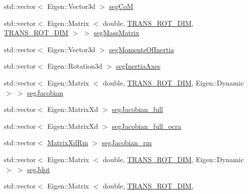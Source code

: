\begin{DoxyCompactItemize}
\item 
std\-::vector$<$ \-Eigen\-::\-Vector3d $>$ \hyperlink{structOcraWbiModel_1_1OcraWbiModel__pimpl_af244a33c7309714ca793d29247ead8b8}{seg\-Co\-M}
\item 
std\-::vector$<$ \-Eigen\-::\-Matrix\*
$<$ double, \hyperlink{OcraWbiModel_8cpp_ab4a87cb824ceff256c6b8bce7701af58}{\-T\-R\-A\-N\-S\-\_\-\-R\-O\-T\-\_\-\-D\-I\-M}, \*
\hyperlink{OcraWbiModel_8cpp_ab4a87cb824ceff256c6b8bce7701af58}{\-T\-R\-A\-N\-S\-\_\-\-R\-O\-T\-\_\-\-D\-I\-M} $>$ $>$ \hyperlink{structOcraWbiModel_1_1OcraWbiModel__pimpl_a3d0cb4cfda4c6ce54020d61f5845dedb}{seg\-Mass\-Matrix}
\item 
std\-::vector$<$ \-Eigen\-::\-Vector3d $>$ \hyperlink{structOcraWbiModel_1_1OcraWbiModel__pimpl_a478fcde74e00dc9b8235bbe5a2c2cb75}{seg\-Moments\-Of\-Inertia}
\item 
std\-::vector$<$ \-Eigen\-::\-Rotation3d $>$ \hyperlink{structOcraWbiModel_1_1OcraWbiModel__pimpl_aba2d3ed2e0c2a1a1b8b4d40c3df6a4a5}{seg\-Inertia\-Axes}
\item 
std\-::vector$<$ \-Eigen\-::\-Matrix\*
$<$ double, \hyperlink{OcraWbiModel_8cpp_ab4a87cb824ceff256c6b8bce7701af58}{\-T\-R\-A\-N\-S\-\_\-\-R\-O\-T\-\_\-\-D\-I\-M}, \*
\-Eigen\-::\-Dynamic $>$ $>$ \hyperlink{structOcraWbiModel_1_1OcraWbiModel__pimpl_a3430097cc1a200a4ff5abcafd52a7d44}{seg\-Jacobian}
\item 
std\-::vector$<$ \-Eigen\-::\-Matrix\-Xd $>$ \hyperlink{structOcraWbiModel_1_1OcraWbiModel__pimpl_abdfc807c93bad49781c9ad0f1588b203}{seg\-Jacobian\-\_\-full}
\item 
std\-::vector$<$ \-Eigen\-::\-Matrix\-Xd $>$ \hyperlink{structOcraWbiModel_1_1OcraWbiModel__pimpl_ad4acb4942706d77c1dfd480132592ded}{seg\-Jacobian\-\_\-full\-\_\-ocra}
\item 
std\-::vector$<$ \hyperlink{namespaceocra__icub_aa5e36a19ed031c28ca83c207bd7dd83f}{\-Matrix\-Xd\-Rm} $>$ \hyperlink{structOcraWbiModel_1_1OcraWbiModel__pimpl_a08c7db0bf6de072dc07a5810311aba48}{seg\-Jacobian\-\_\-rm}
\item 
std\-::vector$<$ \-Eigen\-::\-Matrix\*
$<$ double, \hyperlink{OcraWbiModel_8cpp_ab4a87cb824ceff256c6b8bce7701af58}{\-T\-R\-A\-N\-S\-\_\-\-R\-O\-T\-\_\-\-D\-I\-M}, \*
\-Eigen\-::\-Dynamic $>$ $>$ \hyperlink{structOcraWbiModel_1_1OcraWbiModel__pimpl_ab0371f4015f7abdf795636003e302de1}{seg\-Jdot}
\item 
std\-::vector$<$ \-Eigen\-::\-Matrix\*
$<$ double, \hyperlink{OcraWbiModel_8cpp_ab4a87cb824ceff256c6b8bce7701af58}{\-T\-R\-A\-N\-S\-\_\-\-R\-O\-T\-\_\-\-D\-I\-M}, \*

\end{DoxyCompactItemize}
